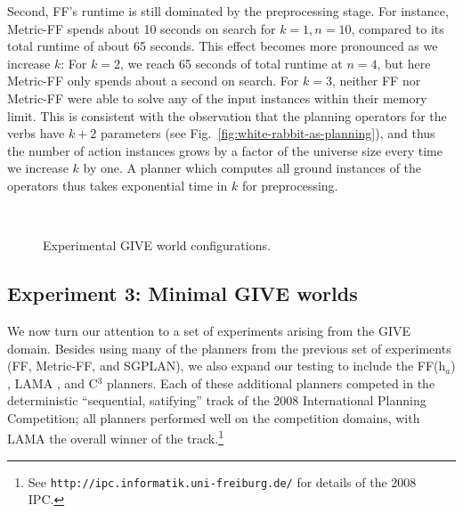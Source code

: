 Second, FF's runtime is still dominated by the preprocessing
stage. For instance, Metric-FF spends about 10 seconds on search for
$k=1,n=10$, compared to its total runtime of about 65 seconds. This
effect becomes more pronounced as we increase $k$: For $k=2$, we reach
65 seconds of total runtime at $n=4$, but here Metric-FF only spends
about a second on search. For $k=3$, neither FF nor Metric-FF were
able to solve any of the input instances within their memory
limit. This is consistent with the observation that the planning
operators for the verbs have $k+2$ parameters (see
Fig.~\ref{fig:white-rabbit-as-planning}), and thus the number of
action instances grows by a factor of the universe size every time we
increase $k$ by one. A planner which computes all ground instances of
the operators thus takes exponential time in $k$ for preprocessing.

\begin{figure}[t]
  \centering
  \qquad
   \\
  \caption{Experimental GIVE world configurations.}
  \label{fig:give-maps}
\end{figure}


\subsection{Experiment 3: Minimal GIVE worlds}
\label{sec:exper-3:-minim}

We now turn our attention to a set of experiments arising from the GIVE domain.
Besides using many of the planners from the previous set of experiments (FF,
Metric-FF, and SGPLAN), we also expand our testing to include the FF(h$_a$)
\citep{keyder08:_ff_h_plann_for_plann}, LAMA \citep{richter08:_lama_plann}, and
C$^3$ \citep{lipovetzky08:_c3} planners. Each of these additional planners
competed in the deterministic ``sequential, satifying'' track of the 2008
International Planning Competition; all planners performed well on the
competition domains, with LAMA the overall winner of the track.\footnote{See
\texttt{http://ipc.informatik.uni-freiburg.de/} for details of the 2008 IPC.}

